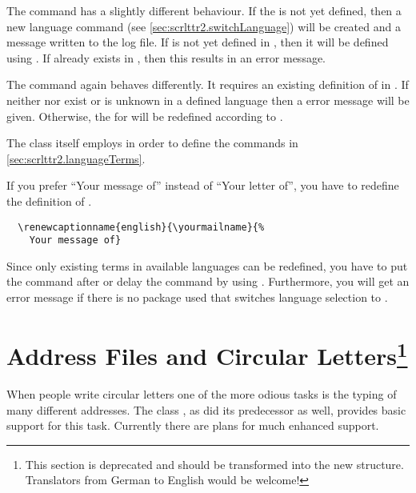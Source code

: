 The command  has a slightly different behaviour.
If the  is not yet defined, then a new language
command (see \autoref{sec:scrlttr2.switchLanguage}) will be created
and a message written to the log file.  If  is not yet
defined in , then it will be defined using
.  If  already exists in
, then this results in an error message.

The command  again behaves differently. It
requires an existing definition of  in .
If neither  nor  exist or  is
unknown in a defined language then a error message will be
given. Otherwise, the  for  will be
redefined according to .

The class  itself employs 
in order to define the commands in
\autoref{sec:scrlttr2.languageTerms}.
\begin{Example}
  If you prefer ``Your message of'' instead of ``Your letter of'', you
  have to redefine the definition of .
\begin{lstlisting}
  \renewcaptionname{english}{\yourmailname}{%
    Your message of}
\end{lstlisting}
  
Since only existing terms in available languages can be redefined, you
have to put the command after  or
delay the command by using . Furthermore, you
will get an error message if there is no package used that switches
language selection to .
\end{Example}
%
%
%
%
%
%
%

\section{Address Files and Circular Letters\protect\footnote{This section is
  deprecated and should be transformed into the new structure. Translators
  from German to English would be welcome!}}
\label{sec:scrlttr2.addressFile}
%

When people write circular letters one of the more odious tasks is the
typing of many different addresses.  The class , as
did its predecessor  as well, provides basic support
for this task.  Currently there are plans for much enhanced support.


